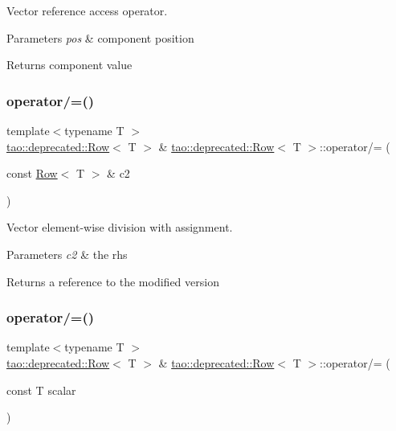 Vector reference access operator. 


\begin{DoxyParams}{Parameters}
{\em pos} & component position \\
\hline
\end{DoxyParams}
\begin{DoxyReturn}{Returns}
component value 
\end{DoxyReturn}
\mbox{\label{classtao_1_1deprecated_1_1_row_af3e824e781b2c81ebbf1dd8739dc3c98}} 
\subsubsection{\texorpdfstring{operator/=()}{operator/=()}\hspace{0.1cm}{\footnotesize\ttfamily [1/2]}}
{\footnotesize\ttfamily template$<$typename T $>$ \\
\mbox{\hyperlink{classtao_1_1deprecated_1_1_row}{tao\+::deprecated\+::\+Row}}$<$ T $>$ \& \mbox{\hyperlink{classtao_1_1deprecated_1_1_row}{tao\+::deprecated\+::\+Row}}$<$ T $>$\+::operator/= (\begin{DoxyParamCaption}\item[{const \mbox{\hyperlink{classtao_1_1deprecated_1_1_row}{Row}}$<$ T $>$ \&}]{c2 }\end{DoxyParamCaption})}



Vector element-\/wise division with assignment. 


\begin{DoxyParams}{Parameters}
{\em c2} & the rhs \\
\hline
\end{DoxyParams}
\begin{DoxyReturn}{Returns}
a reference to the modified version 
\end{DoxyReturn}
\mbox{\label{classtao_1_1deprecated_1_1_row_ab242e3d56534a00c5942c35a4770c79f}} 
\subsubsection{\texorpdfstring{operator/=()}{operator/=()}\hspace{0.1cm}{\footnotesize\ttfamily [2/2]}}
{\footnotesize\ttfamily template$<$typename T $>$ \\
\mbox{\hyperlink{classtao_1_1deprecated_1_1_row}{tao\+::deprecated\+::\+Row}}$<$ T $>$ \& \mbox{\hyperlink{classtao_1_1deprecated_1_1_row}{tao\+::deprecated\+::\+Row}}$<$ T $>$\+::operator/= (\begin{DoxyParamCaption}\item[{const T}]{scalar }\end{DoxyParamCaption})}



